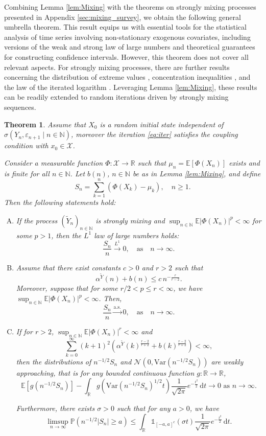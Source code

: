 \documentclass[a4paper,10pt]{article}
\newtheorem{theorem}{Theorem}[section]
\newcommand{\N}{\mathbb{N}}
\newcommand{\R}{\mathbb{R}}
\newcommand{\X}{\mathcal{X}}
\renewcommand{\P}{\mathbb{P}}
\newcommand{\E}{\mathbb{E}}
\newcommand{\Pas}{\text{a.s.}}
\newcommand{\ind}{\mathds{1}}
\newcommand{\eps}{\varepsilon}
\newcommand{\var}{\mathrm{Var}}
\newcommand{\dint}{\mathrm{d}}  %
\begin{document}
Combining Lemma \ref{lem:Mixing} with the theorems on strongly mixing processes presented in Appendix \ref{sec:mixing_survey}, we obtain the following general umbrella theorem. This result equips us with essential tools for the statistical analysis of time series involving non-stationary exogenous covariates, including versions of the weak and strong law of large numbers and theoretical guarantees for constructing confidence intervals. However, this theorem does not cover all relevant aspects. For strongly mixing processes, there are further results concerning the distribution of extreme values \cite{Welsch1972}, concentration inequalities \cite{merlevede2011concentration}, and the law of the iterated logarithm \cite{rio1995LIL}. Leveraging Lemma \ref{lem:Mixing}, these results can be readily extended to random iterations driven by strongly mixing sequences.
\begin{theorem}\label{thm:GeneralResult}
	Assume that $X_0$ is a random initial state independent of $\sigma (Y_n,\eps_{n+1}\mid n\in\N)$, moreover the iteration \eqref{eq:iter} satisfies the coupling condition with $x_0\in\X$.
	
	Consider a measurable function $\Phi:\X \to \R$ such that $\mu_n = \E\left[\Phi (X_n)\right]$ exists and is finite for all $n \in \N$. Let $b(n)$, $n\in\N$ be as in Lemma \ref{lem:Mixing}, and define
	$$
	S_n = \sum_{k=1}^{n} \left(\Phi (X_k) - \mu_k\right), \quad n \ge 1.
	$$
	Then the following statements hold:
	\begin{enumerate}[A)]
		\item If the process $(\tilde{Y}_n)_{n \in \N}$ is strongly mixing and $\sup_{n \in \N} \E |\Phi (X_n)|^p < \infty$ for some $p > 1$, then the $L^1$ law of large numbers holds:
		$$
		\frac{S_n}{n} \stackrel{L^1}{\to} 0,
		\quad \text{as} \quad n \to \infty.
		$$
		
		\item Assume that there exist constants $c > 0$ and $r > 2$ such that
		$$
		\alpha^{\tilde{Y}}(n) + b(n) \le c\, n^{-\frac{r}{r-2}}.
		$$
		Moreover, suppose that for some $r/2 < p \le r < \infty$, we have $\sup_{n \in \N} \E |\Phi(X_n)|^p < \infty$. Then,
		$$
		\frac{S_n}{n} \stackrel{\Pas}{\to} 0,
		\quad \text{as} \quad n \to \infty.
		$$
			
		\item If for $r>2$, $\sup_{n\in\N}\E |\Phi (X_n)|^r<\infty$ and
		$$
		\sum_{k=0}^{\infty} (k+1)^2\left(\alpha^{\tilde{Y}}(k)^{\frac{r-2}{r+2}} + b(k)^{\frac{r-2}{r+2}}\right)<\infty,
		$$
		then the distributions of $n^{-1/2}S_n$ and $\mathcal{N}(0,\var(n^{-1/2}S_n))$ are weakly approaching, that is for any bounded continuous function $g:\R\to\R$,
		$$
		\E \left[g\left(n^{-1/2}S_n\right)\right] - 
		\int_{\R} g\left(\var (n^{-1/2}S_n)^{1/2}t\right)\frac{1}{\sqrt{2\pi}}e^{-\frac{t^2}{2}}\,\dint t
		\to 0\,\,\text{as}\,\,n\to\infty.
		$$ 
		
		Furthermore, there exists $\sigma>0$ such that for any $a>0$, we have
		$$
		\limsup_{n\to\infty}\P (n^{-1/2}|S_n|\ge a)\le \int_{\R}\ind_{[-a,a]^c}(\sigma t)\frac{1}{\sqrt{2\pi}}e^{-\frac{t^2}{2}}\,\dint t.
		$$
	\end{enumerate}	
\end{theorem}
\end{document}
